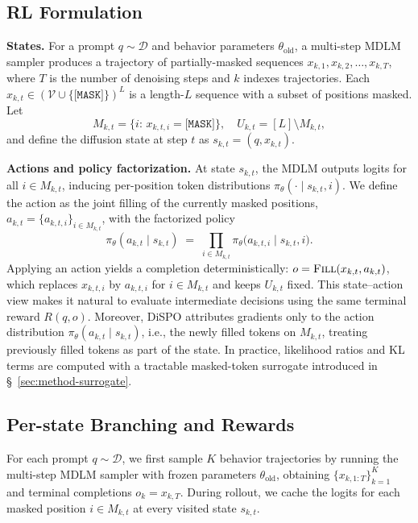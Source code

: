 \documentclass{article}
\theoremstyle{plain}
\theoremstyle{definition}
\theoremstyle{remark}
\begin{document}
\subsection{RL Formulation}
\label{sec:method-states}

\textbf{{States.}}
For a prompt $q \!\sim\! \mathcal{D}$ and behavior parameters $\theta_{\text{old}}$, a multi-step MDLM sampler produces a trajectory of partially-masked sequences
$x_{k,1},x_{k,2},\dots,x_{k,T}$, where $T$ is the number of denoising steps and $k$ indexes trajectories.
Each $x_{k,t}\!\in\!(\mathcal{V}\!\cup\!\{\texttt{[MASK]}\})^{L}$ is a length-$L$ sequence with a subset of positions masked.
Let
\[
  M_{k,t}=\{i:\, x_{k,t,i}=\texttt{[MASK]}\},\quad
  U_{k,t}=[L]\setminus M_{k,t},
\]
and define {the diffusion state} at step $t$ as $s_{k,t}=(q,x_{k,t})$.

\textbf{{Actions} and policy factorization.}
At state $s_{k,t}$, the MDLM outputs logits for all $i\in M_{k,t}$, inducing per-position token distributions $\pi_\theta(\cdot\!\mid\! s_{k,t},i)$.
We define the {action} as the joint filling of the currently masked positions,
$a_{k,t}=\{a_{k,t,i}\}_{i\in M_{k,t}}$, with the factorized policy
\begin{equation}
  \pi_\theta(a_{k,t}\mid s_{k,t})
  \;=\;
  \prod_{i\in M_{k,t}}
  \pi_\theta\bigl(a_{k,t,i}\mid s_{k,t},i\bigr).
  \label{eq:one-step-policy}
\end{equation}
Applying an action yields a completion deterministically:
$o=\textsc{Fill}(x_{k,t},a_{k,t})$, which replaces $x_{k,t,i}$ by $a_{k,t,i}$ for $i\in M_{k,t}$ and keeps $U_{k,t}$ fixed.
This state--action view makes it natural to evaluate intermediate decisions using the same terminal reward $R(q,o)$.
Moreover, DiSPO attributes gradients only to the action distribution $\pi_\theta(a_{k,t}\mid s_{k,t})$, i.e., the newly filled tokens on $M_{k,t}$, treating previously filled tokens as part of the state.
In practice, likelihood ratios and KL terms are computed with a tractable masked-token surrogate introduced in \S~\ref{sec:method-surrogate}.

\subsection{Per-state Branching and Rewards}
\label{sec:method-branch}

For each prompt $q\!\sim\!\mathcal{D}$, we first sample $K$ behavior trajectories by running the multi-step MDLM sampler with frozen parameters $\theta_{\text{old}}$,
obtaining $\{x_{k,1:T}\}_{k=1}^K$ and terminal completions $o_k\!=\!x_{k,T}$.
During rollout, we cache the logits for each masked position $i\!\in\! M_{k,t}$ at every visited state $s_{k,t}$.
\end{document}
